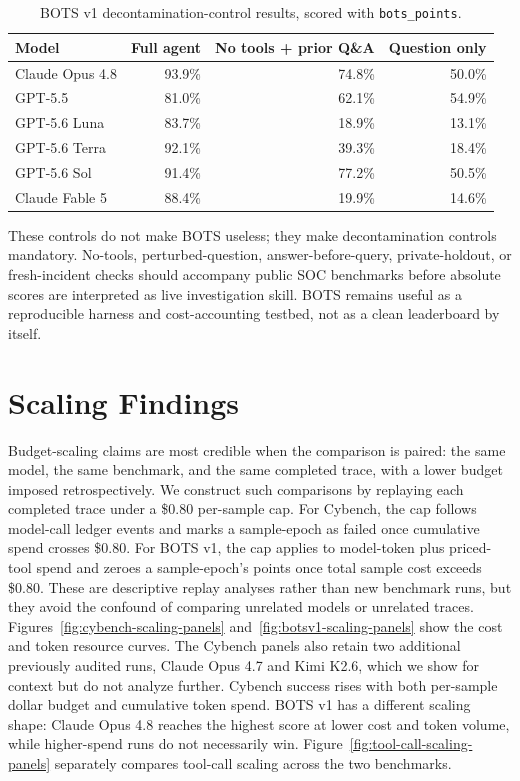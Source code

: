 \documentclass{jmlr}%
\begin{document}
\begin{table}[t]
\centering
\caption{BOTS v1 decontamination-control results, scored with \texttt{bots\_points}.}
\label{tab:bots-no-tools}
\small
\begin{tabular*}{\linewidth}{@{\extracolsep{\fill}}lrrr@{}}
\toprule
Model & Full agent & No tools + prior Q\&A & Question only \\
\midrule
Claude Opus 4.8 & 93.9\% & 74.8\% & 50.0\% \\
GPT-5.5 & 81.0\% & 62.1\% & 54.9\% \\
GPT-5.6 Luna & 83.7\% & 18.9\% & 13.1\% \\
GPT-5.6 Terra & 92.1\% & 39.3\% & 18.4\% \\
GPT-5.6 Sol & 91.4\% & 77.2\% & 50.5\% \\
Claude Fable 5 & 88.4\% & 19.9\% & 14.6\% \\
\bottomrule
\end{tabular*}
\end{table}

These controls do not make BOTS useless; they make decontamination controls mandatory.
No-tools, perturbed-question, answer-before-query, private-holdout, or fresh-incident checks should accompany public SOC benchmarks before absolute scores are interpreted as live investigation skill.
BOTS remains useful as a reproducible harness and cost-accounting testbed, not as a clean leaderboard by itself.

\section{Scaling Findings}
\label{sec:scaling-findings}

Budget-scaling claims are most credible when the comparison is paired: the same model, the same benchmark, and the same completed trace, with a lower budget imposed retrospectively.
We construct such comparisons by replaying each completed trace under a \$0.80 per-sample cap.
For Cybench, the cap follows model-call ledger events and marks a sample-epoch as failed once cumulative spend crosses \$0.80.
For BOTS v1, the cap applies to model-token plus priced-tool spend and zeroes a sample-epoch's points once total sample cost exceeds \$0.80.
These are descriptive replay analyses rather than new benchmark runs, but they avoid the confound of comparing unrelated models or unrelated traces.
Figures~\ref{fig:cybench-scaling-panels} and~\ref{fig:botsv1-scaling-panels} show the cost and token resource curves.
The Cybench panels also retain two additional previously audited runs, Claude Opus 4.7 and Kimi K2.6, which we show for context but do not analyze further.
Cybench success rises with both per-sample dollar budget and cumulative token spend.
BOTS v1 has a different scaling shape: Claude Opus 4.8 reaches the highest score at lower cost and token volume, while higher-spend runs do not necessarily win.
Figure~\ref{fig:tool-call-scaling-panels} separately compares tool-call scaling across the two benchmarks.
\end{document}

